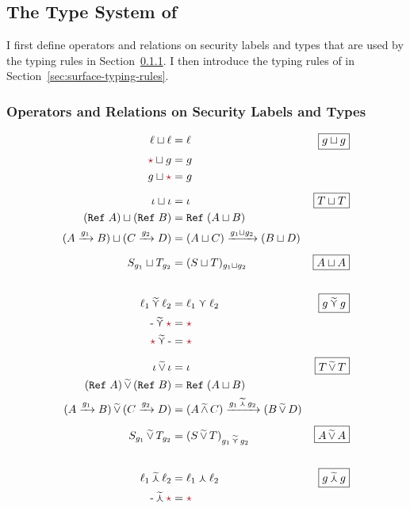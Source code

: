 \subsection{The Type System of \Surface}
\label{sec:surface-typing}

I first define operators and relations on security labels and types that are
used by the typing rules in Section~\ref{sec:ops-and-rels}. I then introduce
the typing rules of \Surface in Section~\ref{sec:surface-typing-rules}.

\subsubsection{Operators and Relations on Security Labels and Types}
\label{sec:ops-and-rels}

\begin{figure}[tbp]
\begin{align*}
\ell \sqcup \ell &= \ell & \fbox{$g \sqcup g$}\\
\unk \sqcup g &= g \\
g \sqcup \unk &= g \\[1ex]
\iota \sqcup \iota &= \iota & \fbox{$T \sqcup T$} \\
(\Refer{A}) \sqcup (\Refer{B}) &= \Refer{(A \sqcup B)} \\
(\Fun{A}{g_1}{B}) \sqcup (\Fun{C}{g_2}{D}) &= \Fun{(A \sqcup C)}{g_1 \sqcup g_2}{(B \sqcup D)} \\[1ex]
S_{g_1} \sqcup T_{g_2} &= (S \sqcup T)_{g_1 \sqcup g_2}  & \fbox{$A \sqcup A$}
\\[4ex]
\ell_1 \lconsisjoin \ell_2 &= \ell_1 \curlyvee \ell_2 &\fbox{$g \lconsisjoin g$}\\
\text{-} \lconsisjoin \unk &= \unk \\
\unk \lconsisjoin \text{-} &= \unk \\[1ex]
\iota \consisjoin \iota &= \iota & \fbox{$T \consisjoin T$}\\
(\Refer{A}) \consisjoin (\Refer{B}) &= \Refer{(A \sqcup B)} \\
(\Fun{A}{g_1}{B}) \consisjoin (\Fun{C}{g_2}{D}) &= \Fun{(A \consismeet C)}{g_1 \lconsismeet g_2}{(B \consisjoin D)} \\[1ex]
S_{g_1} \consisjoin T_{g_2} &= (S \consisjoin T)_{g_1 \lconsisjoin g_2} & \fbox{$A \consisjoin A$}
\\[4ex]
\ell_1 \lconsismeet \ell_2 &= \ell_1 \curlywedge \ell_2 & \fbox{$g \lconsismeet g$}\\
\text{-} \lconsismeet \unk &= \unk \\

\end{align*}
\end{figure}
